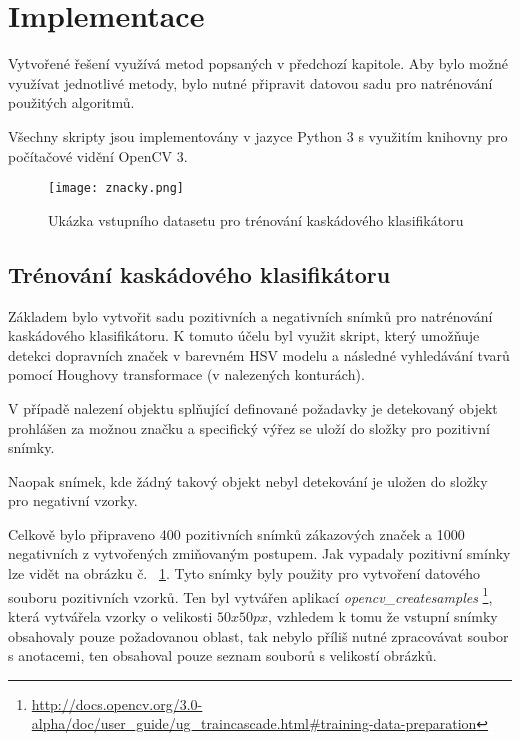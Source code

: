 \documentclass[czech]{ExcelAtFIT} %
\begin{document}






\section{Implementace}
\label{sec:UsefulTools}
Vytvořené řešení využívá metod popsaných v předchozí kapitole. Aby bylo možné využívat jednotlivé metody, bylo nutné připravit datovou sadu pro natrénování použitých algoritmů.

Všechny skripty jsou implementovány v jazyce Python 3 s využitím knihovny pro počítačové vidění OpenCV 3.

\begin{figure}[t!]
\texttt{[image: znacky.png]}\\[1pt]
\caption{Ukázka vstupního datasetu pro trénování kaskádového klasifikátoru}
\label{fig:PositiveSigns}
\end{figure}

\subsection{Trénování kaskádového klasifikátoru}
\label{sec:Images}
Základem bylo vytvořit sadu pozitivních a negativních snímků pro natrénování kaskádového klasifikátoru. K tomuto účelu byl využit skript, který umožňuje detekci dopravních značek v barevném HSV modelu a následné vyhledávání tvarů pomocí Houghovy transformace (v nalezených konturách).

V případě nalezení objektu splňující definované požadavky je detekovaný objekt prohlášen za možnou značku a specifický výřez se uloží do složky pro pozitivní snímky. 

Naopak snímek, kde žádný takový objekt nebyl detekování je uložen do složky pro negativní vzorky.

Celkově bylo připraveno 400 pozitivních snímků zákazových značek a 1000 negativních z vytvořených zmiňovaným postupem. Jak vypadaly pozitivní smínky lze vidět na obrázku č. ~\ref{fig:PositiveSigns}. Tyto snímky byly použity pro vytvoření datového souboru pozitivních vzorků. Ten byl vytvářen aplikací \emph{opencv\_createsamples}%
	  \footnote{\url{http://docs.opencv.org/3.0-alpha/doc/user\_guide/ug\_traincascade.html\#training-data-preparation}}, která vytvářela vzorky o velikosti $50x50 px$, vzhledem k tomu že vstupní snímky obsahovaly pouze požadovanou oblast, tak nebylo příliš nutné zpracovávat soubor s anotacemi, ten obsahoval pouze seznam souborů s velikostí obrázků.
\end{document}
